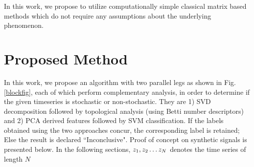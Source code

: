 \documentclass[journal]{IEEEtran}
\begin{document}
	In this work, we propose to utilize computationally simple classical matrix based methods which do not require any assumptions about the underlying phenomenon.
	
	\section{Proposed Method}
	
	In this work, we propose an algorithm with two parallel legs as shown in Fig. \ref{blockfig}, each of which perform complementary analysis, in order to determine if the given timeseries is stochastic or non-stochastic. They are 1) SVD decomposition followed by topological analysis (using Betti number descriptors) and 2) PCA derived features followed by SVM classification. If the labels obtained using the two approaches concur, the corresponding label is retained; Else the result is declared ``Inconclusive". Proof of concept on synthetic signals is presented below. In the following sections, $z_1, z_2 \mathellipsis z_N$ denotes the time series of length $N$
	
\end{document}
